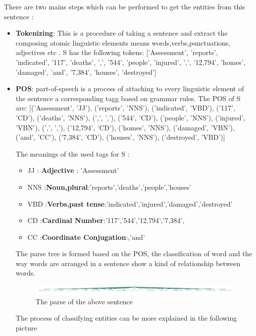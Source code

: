 There are two mains steps which can be performed to get the entities from  this sentence :
\begin{itemize}
\item \textbf{Tokenizing}: This is a procedure of taking a sentence and extract the composing atomic linguistic elements means words,verbs,punctuations, adjectives etc .
S has the following tokens: ['Assessment', 'reports', 'indicated', '117', 'deaths', ',', '544', 'people', 'injured', ',', '12,794', 'homes', 'damaged', 'and', '7,384', 'houses', 'destroyed']
\item \textbf{POS}: part-of-speech is a process of attaching to every linguistic element of the sentence a corresponding tagg based on grammar rules.
The POS of S  are: 
[('Assessment', 'JJ'), ('reports', 'NNS'), ('indicated', 'VBD'), ('117', 'CD'), ('deaths', 'NNS'), (',', ','), ('544', 'CD'), ('people', 'NNS'), ('injured', 'VBN'), (',', ','), ('12,794', 'CD'), ('homes', 'NNS'), ('damaged', 'VBN'), ('and', 'CC'), ('7,384', 'CD'), ('houses', 'NNS'), ('destroyed', 'VBD')]

The meanings of the used tags for S :

\begin{itemize}
\item JJ : \textbf{Adjective} :  'Assessment'   
\item NNS :\textbf{Noun,plural}:'reports','deaths','people','houses'
\item VBD :\textbf{Verbs,past tense}:'indicated','injured','damaged','destroyed'
\item CD :\textbf{Cardinal Number}:'117','544','12,794','7,384',
\item CC :\textbf{Coordinate Conjugation}:,'and'
\end{itemize}
The parse tree is formed based on the POS, the classification of word and the way words are arranged in a sentence show a kind of relationship between words.
\begin{figure}[hbtp]
\caption{The parse of the above sentence}
\centering
\includegraphics[scale=1]{images/parse.png}
\end{figure}


The process of classifying entities can be more explained in the following picture


\end{itemize}

